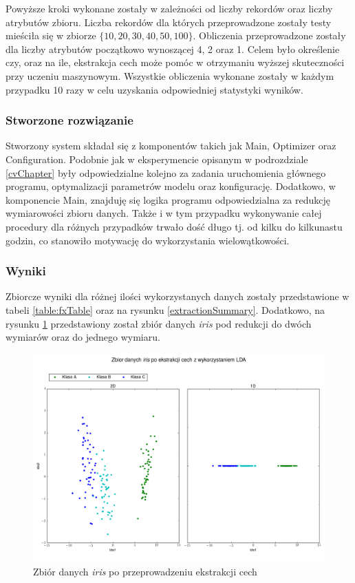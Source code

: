 Powyższe kroki wykonane zostały w zależności od liczby rekordów oraz liczby atrybutów zbioru. Liczba rekordów dla których przeprowadzone zostały testy mieściła się w zbiorze $ \{10, 20, 30, 40, 50, 100\} $. Obliczenia przeprowadzone zostały dla liczby atrybutów początkowo wynoszącej 4, 2 oraz 1. Celem było określenie czy, oraz na ile, ekstrakcja cech może pomóc w otrzymaniu wyższej skuteczności przy uczeniu maszynowym. Wszystkie obliczenia wykonane zostały w każdym przypadku 10 razy w celu uzyskania odpowiedniej statystyki wyników.

\subsubsection{Stworzone rozwiązanie}
Stworzony system składał się z komponentów takich jak Main, Optimizer oraz Configuration. Podobnie jak w eksperymencie opisanym w podrozdziale \ref{cvChapter} były odpowiedzialne kolejno za zadania uruchomienia głównego programu, optymalizacji parametrów modelu oraz konfigurację. Dodatkowo, w komponencie Main, znajduję się logika programu odpowiedzialna za redukcję wymiarowości zbioru danych. Także i w tym przypadku wykonywanie całej procedury dla różnych przypadków trwało dość długo tj. od kilku do kilkunastu godzin, co stanowiło motywację do wykorzystania wielowątkowości.

\subsubsection{Wyniki}
Zbiorcze wyniki dla różnej ilości wykorzystanych danych zostały przedstawione w tabeli \ref{table:fxTable} oraz na rysunku \ref{extractionSummary}. Dodatkowo, na rysunku \ref{showMeIris} przedstawiony został zbiór danych \textit{iris} pod redukcji do dwóch wymiarów oraz do jednego wymiaru.

\begin{figure}[ht!]
\centering
\includegraphics[scale=0.45]{res/showMeIris.png}
\caption[Caption for LOF]{Zbiór danych \textit{iris} po przeprowadzeniu ekstrakcji cech\label{showMeIris}}
\end{figure} 

